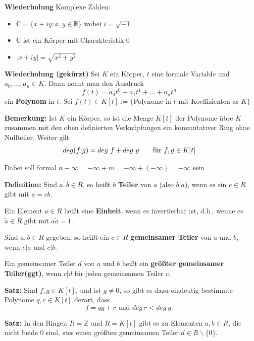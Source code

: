 \documentclass{article}
\let\oldcdot\cdot
\renewcommand{\cdot}{\raisebox{0.1ex}{$\oldcdot$}}
\begin{document}
\textbf{Wiederholung} Komplexe Zahlen: 
\begin{itemize}
\item $\mathbb{C}=\{x+iy: x,y\in\mathbb{R}\}$ wobei $i=\sqrt{-1}$
\item $\mathbb{C}$ ist ein Körper mit Charakteristik 0
\item $|x+iy| = \sqrt{x^2 + y^2}$
\end{itemize}

\textbf{Wiederholung (gekürzt)} Sei $K$ ein Körper, $t$ eine formale Variable
und $a_0,\dots,a_n\in K$. Dann nennt man den Ausdruck 
\begin{equation*}
	f(t)=a_0t^0+a_1t^1+\dots+a_nt^n
\end{equation*}
ein \textbf{Polynom} in $t$. Sei $f(t)\in K[t]:=\{$Polynome in $t$ mit
Koeffizienten as $K\}$

\textbf{Bemerkung:} Ist $K$ ein Körper, so ist die Menge $K[t]$ der Polynome
übre $K$ zusammen mit den oben definierten Verknüpfungen ein kommutativer Ring
ohne Nullteiler. Weiter gilt
\begin{equation*}
	deg(f\cdot g) = deg\ f+ deg\ g \qquad \text{für } f,g\in K[t]
\end{equation*}

Dabei soll formal $n-\infty = -\infty+m= -\infty + (-\infty) = -\infty$ sein

\textbf{Definition: }Sind $a,b\in R$, so heißt $b$ \textbf{Teiler} von $a$
(also $b|a$), wenn es ein $c\in R$ gibt mit $a=cb$. 

Ein Element $a\in R$ heißt eine \textbf{Einheit}, wenn es invertierbar ist,
d.h., wenne es $\tilde{a}\in R$ gibt mit $a\tilde{a}= 1$.

Sind $a,b\in R$ gegeben, so heißt ein $c\in R$ \textbf{gemeinsamer Teiler} von
$a$ und $b$, wenn $c|a$ und $c|b$. 

Ein gemeinsamer Teiler $d$ von $a$ und $b$ heißt ein \textbf{größter
gemeinsamer Teiler(ggt)}, wenn $c|d$ für jeden gemeinsamen Teiler $c$.

\textbf{Satz:} Sind $f,g\in K[t]$, und ist $g\neq 0$, so gibt es dazu eindeutig
bestimmte Polynome $q,r\in K[t]$ derart, dass 
\begin{equation*}
	f=qg+r\text{ und }deg\ r < deg\ g.
\end{equation*}

\textbf{Satz:} In den Ringen $R=\mathbb{Z}$ und $R=K[t]$ gibt es zu Elementen
$a,b\in R$, die nicht beide 0 sind, stes einen größten gemeinsamen Teiler $d\in
R\backslash\{0\}$.
\end{document}
